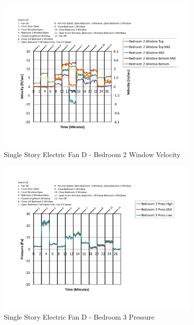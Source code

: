 \documentclass{article}
\begin{document}
\begin{appendices}
	\begin{figure}[H]
		\centering
		\includegraphics[height=3.05in,trim=0.67in 1.1in 0.67in 0.8in,clip=true]{0_Images/Results_Charts/ColdFlow/Single_Story/Electric/D/Bedroom_2_Window_Velocity.pdf}
		\caption{Single Story Electric Fan D - Bedroom 2 Window Velocity}
	\end{figure}
 

	\begin{figure}[H]
		\centering
		\includegraphics[height=3.05in,trim=0.67in 1.1in 0.67in 0.8in,clip=true]{0_Images/Results_Charts/ColdFlow/Single_Story/Electric/D/Bedroom_3_Pressure.pdf}
		\caption{Single Story Electric Fan D - Bedroom 3 Pressure}
	\end{figure}
 
	\clearpage


\end{appendices}
\end{document}
